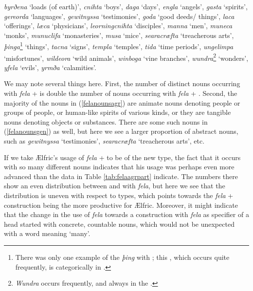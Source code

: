 \documentclass[output=paper,colorlinks,citecolor=brown]{langscibook}
\begin{document}
\begin{exe}
    \ex \label{felanounsgen}
\textit{byrðena} ‘loads (of earth)’, \textit{cnihta} ‘boys’, \textit{daga} ‘days’, \textit{engla} ‘angels’, \textit{gasta} ‘spirits’, \textit{gereorda} ‘languages’, \textit{gewitnyssa} ‘testimonies’, \textit{goda} ‘good deeds/ things’, \textit{laca} ‘offerings’, \textit{læca} ‘physicians’, \textit{leorningcnihta} ‘disciples’, \textit{manna} ‘men’, \textit{muneca} ‘monks’, \textit{munuclifa} ‘monasteries’, \textit{musa} ‘mice’, \textit{searacræfta} ‘treacherous arts’, \textit{þinga}\footnote{There was only one example of the  \textit{þing} with ; this , which occurs quite frequently, is categorically in .} ‘things’, \textit{tacna} ‘signs’, \textit{templa} ‘temples’, \textit{tida} ‘time periods’, \textit{ungelimpa} ‘misfortunes’, \textit{wildeora} ‘wild animals’, \textit{winboga} ‘vine branches’, \textit{wundra}\footnote{\textit{Wundra }occurs frequently, and always in the .} ‘wonders’, \textit{yfela} ‘evils’, \textit{yrmða} ‘calamities’.
\end{exe}


We may note several things here. First, the number of distinct nouns occurring with \textit{fela} +  is double the number of nouns occurring with \textit{fela} + . Second, the majority of the nouns in (\ref{felanounsagr}) are animate nouns denoting people or groups of people, or human-like spirits of various kinds, or they are tangible nouns denoting objects or substances. There are some such nouns in (\ref{felanounsgen})  as well, but here we see a larger proportion of abstract nouns, such as \textit{gewitnyssa} ‘testimonies’, \textit{searacræfta} ‘treacherous arts’, etc. 

If we take Ælfric’s usage of \textit{fela }+  to be of the new type, the fact that it occurs with so many different nouns indicates that his usage was perhaps even more advanced than the data in Table \ref{tab:felaagrpart} indicate. The numbers there show an even distribution between  and  with \textit{fela}, but here we see that the distribution is uneven with respect to  types, which points towards the \textit{fela} +  construction being the more productive  for Ælfric. Moreover, it might indicate that the change in the use of \textit{fela }towards a construction with \textit{fela} as specifier of a  head started with concrete, countable nouns, which would not be unexpected with a word meaning ‘many’. 
\end{document}
